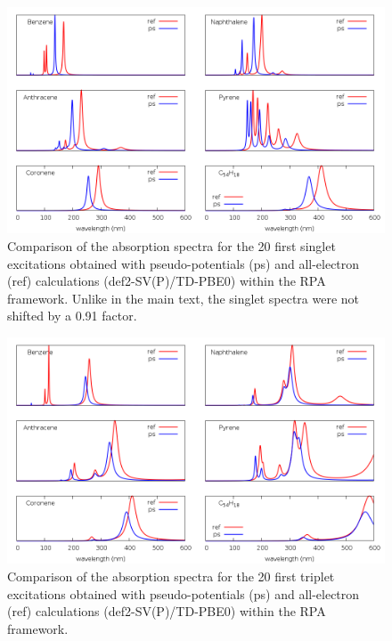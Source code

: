 \documentclass[aip]{revtex4-1}
\begin{document}
\begin{figure}
\begin{center}
\includegraphics[width=16cm]{grand_rpas}
\end{center}
\vspace{0.25in}
\hspace*{3in}
\caption{Comparison of the absorption spectra for the 20 first singlet excitations obtained with
pseudo-potentials (ps) and all-electron (ref) calculations (def2-SV(P)/TD-PBE0) within the RPA
framework.
Unlike in the main text, the singlet spectra were not shifted by a 0.91 factor.}
\label{fig:cnhn_uv_rpas}
\end{figure}

\begin{figure}
\begin{center}
\includegraphics[width=16cm]{grand_rpat}
\end{center}
\vspace{0.25in}
\hspace*{3in}
\caption{Comparison of the absorption spectra for the 20 first triplet excitations obtained with
pseudo-potentials (ps) and all-electron (ref) calculations (def2-SV(P)/TD-PBE0) within the RPA
framework.}
\label{fig:cnhn_uv_rpat}
\end{figure}
\end{document}
